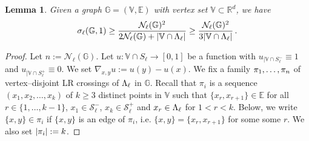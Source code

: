 \documentclass[12pt,a4paper,reqno]{amsart}
\newtheorem{Lemma}[Theorem]{Lemma}
\newcommand{\cN}{\ensuremath{\mathcal N}}
\newcommand{\cS}{\ensuremath{\mathcal S}}
\newcommand{\bbE}{{\ensuremath{\mathbb E}} }
\newcommand{\bbG}{{\ensuremath{\mathbb G}} }
\newcommand{\bbR}{{\ensuremath{\mathbb R}} }
\newcommand{\bbV}{{\ensuremath{\mathbb V}} }
\newcommand{\rosso}{\textcolor{black}} %
\newcommand{\be}{\begin{equation}}
\newcommand{\en}{\end{equation}}
\begin{document}
\begin{Lemma}\label{lemma_LB_chiave}
Given a graph $\bbG=(\bbV,\bbE)$ with vertex set  $\bbV\subset \bbR^d$, we have\be\label{LB_chiave}
\s_\ell (\bbG, 1) \geq \frac{\cN_\ell(\bbG) ^2 }{2\cN_\ell(\bbG)+ |\bbV \cap \L_\ell|}\geq \frac{\cN_\ell(\bbG) ^2 }{3 |\bbV \cap \L_\ell|} \,.
\en
\end{Lemma}

\begin{proof} Let $n:= \cN_\ell (\bbG)$.
Let $u : \bbV\cap S_\ell \to [0,1]$ be a function with $u_{ |\bbV \cap S_\ell^-}\equiv 1$ and $u_{|\bbV \cap S_\ell^+}\equiv 0$. We set $\nabla_{x,y}u :=u(y)-u(x)$.  We fix a family  $\pi_1,\ldots,\pi_n$ of  vertex--disjoint LR crossings of $\Lambda_\ell$ in $\bbG$. Recall that $\pi_i $ is a sequence $(x_1, x_2, \dots, x_k)$ of $k\geq 3$ distinct points in $\bbV$ such that 
$\{x_r,x_{r+1}\}\in \bbE$ for all $r\in\{1,\dots, k-1\}$, 
$x_1 \in \cS_\ell^-$, $x_k \in \cS_\ell^+$ and $x_r\in \Lambda_\ell  $ for $1< r<k$. Below, we write $\{x,y\}\in \pi_i$ if $\{x,y\}$ is an edge of $\pi_i$, i.e. $\{x,y\}=\{x_r, x_{r+1}\}$ for some some $r$. We also set $|\pi_i|:= k$. 
 


\end{proof}
\end{document}
